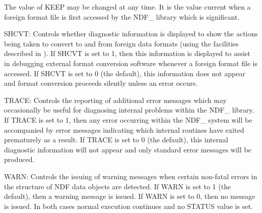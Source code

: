 {{{         The value of KEEP may be changed at any time. It is the value
         current when a foreign format file is first accessed by the NDF\_
         library which is significant.

         \sstitem
         SHCVT: Controls whether diagnostic information is displayed
         to show the actions being taken to convert to and from foreign
         data formats (using the facilities described in
). If SHCVT
         is set to 1, then this information is displayed to assist in
         debugging external format conversion software whenever a foreign
         format file is accessed. If SHCVT is set to 0 (the default), this
         information does not appear and format conversion proceeds
         silently unless an error occurs.

         \sstitem
         TRACE: Controls the reporting of additional error messages
         which may occasionally be useful for diagnosing internal problems
         within the NDF\_ library. If TRACE is set to 1, then any error
         occurring within the NDF\_ system will be accompanied by error
         messages indicating which internal routines have exited
         prematurely as a result. If TRACE is set to 0 (the default),
         this internal diagnostic information will not appear and only
         standard error messages will be produced.

         \sstitem
         WARN: Controls the issuing of warning messages when certain
         non-fatal errors in the structure of NDF data objects are
         detected. If WARN is set to 1 (the default), then a warning
         message is issued. If WARN is set to 0, then no message is
         issued.  In both cases normal execution continues and no STATUS
         value is set.
      }
   }
}
